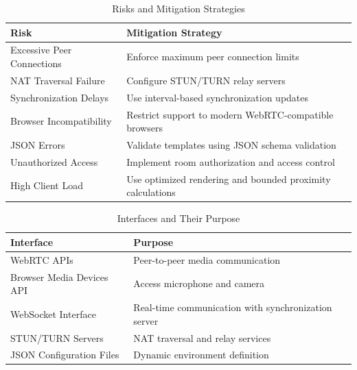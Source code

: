 \documentclass[12pt]{article}
\begin{document}
\begin{table}[h!]
\centering
\renewcommand{\arraystretch}{1.5}
\begin{tabular}{|p{6cm}|p{8cm}|}
\hline
\textbf{Risk} & \textbf{Mitigation Strategy} \\ 
\hline

Excessive Peer Connections & Enforce maximum peer connection limits \\ 
\hline

NAT Traversal Failure & Configure STUN/TURN relay servers \\ 
\hline

Synchronization Delays & Use interval-based synchronization updates \\ 
\hline

Browser Incompatibility & Restrict support to modern WebRTC-compatible browsers \\ 
\hline

JSON Errors & Validate templates using JSON schema validation \\ 
\hline

Unauthorized Access & Implement room authorization and access control \\ 
\hline

High Client Load & Use optimized rendering and bounded proximity calculations \\ 
\hline

\end{tabular}
\caption{Risks and Mitigation Strategies}

\end{table}

\begin{table}[h!]
\centering
\renewcommand{\arraystretch}{1.5}
\begin{tabular}{|p{6cm}|p{8cm}|}
\hline
\textbf{Interface} & \textbf{Purpose} \\ 
\hline

WebRTC APIs & Peer-to-peer media communication \\ 
\hline

Browser Media Devices API & Access microphone and camera \\ 
\hline

WebSocket Interface & Real-time communication with synchronization server \\ 
\hline

STUN/TURN Servers & NAT traversal and relay services \\ 
\hline

JSON Configuration Files & Dynamic environment definition \\ 
\hline

\end{tabular}
\caption{Interfaces and Their Purpose}

\end{table}
\end{document}
